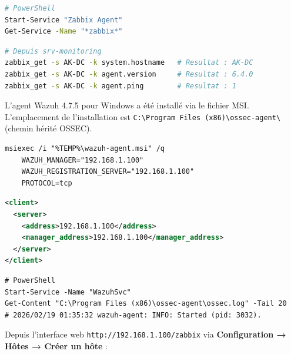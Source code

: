 \documentclass[a4paper,12pt,openany,oneside]{article}
\begin{document}

\begin{lstlisting}[language=bash]
# PowerShell
Start-Service "Zabbix Agent"
Get-Service -Name "*zabbix*"
\end{lstlisting}

\begin{lstlisting}[language=bash]
# Depuis srv-monitoring
zabbix_get -s AK-DC -k system.hostname   # Resultat : AK-DC
zabbix_get -s AK-DC -k agent.version     # Resultat : 6.4.0
zabbix_get -s AK-DC -k agent.ping        # Resultat : 1
\end{lstlisting}


L'agent Wazuh 4.7.5 pour Windows a été installé via le fichier MSI. L'emplacement de l'installation est \texttt{C:\textbackslash{}Program Files (x86)\textbackslash{}ossec-agent\textbackslash{}} (chemin hérité OSSEC).


\begin{lstlisting}
msiexec /i "%TEMP%\wazuh-agent.msi" /q
    WAZUH_MANAGER="192.168.1.100"
    WAZUH_REGISTRATION_SERVER="192.168.1.100"
    PROTOCOL=tcp
\end{lstlisting}


\begin{lstlisting}[language=xml]
<client>
  <server>
    <address>192.168.1.100</address>
    <manager_address>192.168.1.100</manager_address>
  </server>
</client>
\end{lstlisting}


\begin{lstlisting}
# PowerShell
Start-Service -Name "WazuhSvc"
Get-Content "C:\Program Files (x86)\ossec-agent\ossec.log" -Tail 20
# 2026/02/19 01:35:32 wazuh-agent: INFO: Started (pid: 3032).
\end{lstlisting}

\newpage



Depuis l'interface web \texttt{http://192.168.1.100/zabbix} via \textbf{Configuration → Hôtes → Créer un hôte} :
\end{document}
